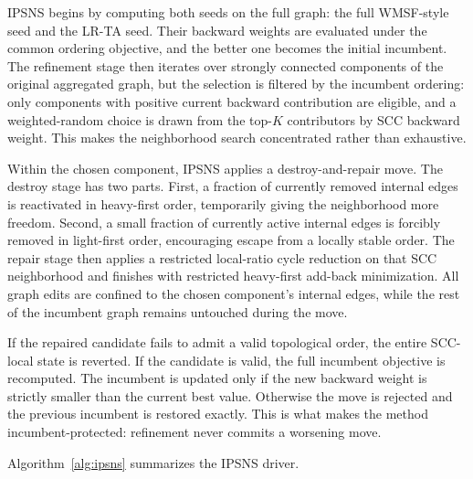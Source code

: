 IPSNS begins by computing both seeds on the full graph: the full WMSF-style seed and the LR-TA seed. Their backward weights are evaluated under the common ordering objective, and the better one becomes the initial incumbent. The refinement stage then iterates over strongly connected components of the original aggregated graph, but the selection is filtered by the incumbent ordering: only components with positive current backward contribution are eligible, and a weighted-random choice is drawn from the top-\(K\) contributors by SCC backward weight. This makes the neighborhood search concentrated rather than exhaustive.

Within the chosen component, IPSNS applies a destroy-and-repair move. The destroy stage has two parts. First, a fraction of currently removed internal edges is reactivated in heavy-first order, temporarily giving the neighborhood more freedom. Second, a small fraction of currently active internal edges is forcibly removed in light-first order, encouraging escape from a locally stable order. The repair stage then applies a restricted local-ratio cycle reduction on that SCC neighborhood and finishes with restricted heavy-first add-back minimization. All graph edits are confined to the chosen component's internal edges, while the rest of the incumbent graph remains untouched during the move.

If the repaired candidate fails to admit a valid topological order, the entire SCC-local state is reverted. If the candidate is valid, the full incumbent objective is recomputed. The incumbent is updated only if the new backward weight is strictly smaller than the current best value. Otherwise the move is rejected and the previous incumbent is restored exactly. This is what makes the method incumbent-protected: refinement never commits a worsening move.

Algorithm~\ref{alg:ipsns} summarizes the IPSNS driver.

